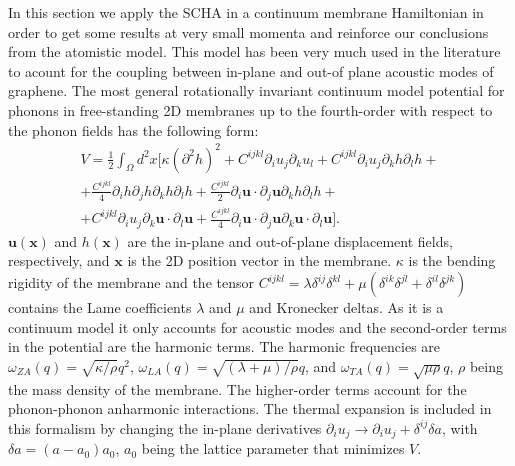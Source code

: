In this section we apply the SCHA in a continuum membrane Hamiltonian in order to get some results at very small 
momenta and reinforce our conclusions from the atomistic model. This model has been very much used in the 
literature to acount for the coupling between in-plane and out-of plane acoustic modes of 
graphene\cite{mariani2008flexural,amorim2014thermodynamics,de2012bending}. The most general rotationally invariant 
continuum model potential for phonons in free-standing 2D membranes up to the fourth-order with respect to the 
phonon fields has the following form:
\begin{multline}
 \label{membrane-potential}
 V=\frac{1}{2}\int_{\Omega}d^{2}x[\kappa(\partial^{2}h)^{2}+C^{ijkl}\partial_{i}u_{j}\partial_{k}u_{l}+C^{ijkl}\partial_{i}u_{j}\partial_{k}h\partial_{l}h+\\ +\frac{C^{ijkl}}{4}\partial_{i}h\partial_{j}h\partial_{
 k}h\partial_{l}h+\frac{C^{ijkl}}{2}\partial_{i}\boldsymbol{u}\cdot\partial_{j}\boldsymbol{u}\partial_{k}h\partial_{l}h+\\+C^{ijkl}\partial_{i}u_{j}\partial_{k}\boldsymbol{u}\cdot\partial_{l}\boldsymbol{u}+
 \frac{C^{ijkl}}{4}\partial_{i}\boldsymbol{u}\cdot\partial_{j}\boldsymbol{u}\partial_{k}\boldsymbol{u}\cdot\partial_{l}\boldsymbol{u}].
\end{multline}
$\boldsymbol{u}(\boldsymbol{x})$ and $h(\boldsymbol{x})$ are the in-plane and out-of-plane displacement 
fields, respectively, and $\boldsymbol{x}$ is the 2D position vector in the membrane. $\kappa$ is the bending 
rigidity of the membrane and the tensor 
$C^{ijkl}=\lambda\delta^{ij}\delta^{kl}+\mu(\delta^{ik}\delta^{jl}+\delta^{il}\delta^{jk})$ contains the Lame 
coefficients $\lambda$ and $\mu$ and Kronecker deltas. As it is a continuum model it only accounts for acoustic 
modes and the second-order terms in the potential are the harmonic terms. The harmonic frequencies are 
$\omega_{ZA}(q)=\sqrt{\kappa/\rho}q^{2}$, $\omega_{LA}(q)=\sqrt{(\lambda+\mu)/\rho}q$, and 
$\omega_{TA}(q)=\sqrt{\mu\rho} q$, $\rho$ being the mass density of the membrane. The higher-order terms account 
for the phonon-phonon anharmonic interactions. The thermal expansion is included in this formalism by changing the 
in-plane derivatives $\partial_{i}u_{j}\rightarrow \partial_{i}u_{j}+\delta^{ij}\delta a$, with 
$\delta a=(a-a_{0})a_{0}$, $a_{0}$ being the lattice parameter that minimizes $V$. \\

